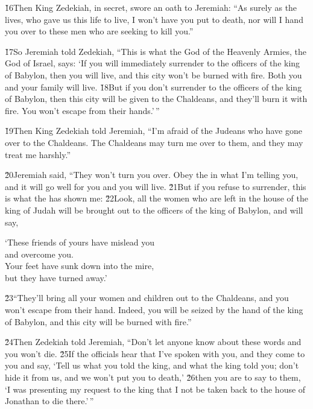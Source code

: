 \v{16}Then King Zedekiah, in secret, swore an oath to Jeremiah: ``As surely as the  lives, who gave us this life to live, I won't have you put to death, nor will I hand you over to these men who are seeking to kill you.''

\v{17}So Jeremiah told Zedekiah, ``This is what the  God of the Heavenly Armies, the God of Israel, says: `If you will immediately surrender to the officers of the king of Babylon, then you will live, and this city won't be burned with fire. Both you and your family will live. \v{18}But if you don't surrender to the officers of the king of Babylon, then this city will be given to the Chaldeans, and they'll burn it with fire. You won't escape from their hands.'\,''

\v{19}Then King Zedekiah told Jeremiah, ``I'm afraid of the Judeans who have gone over to the Chaldeans. The Chaldeans may turn me over to them, and they may treat me harshly.''

\v{20}Jeremiah said, ``They won't turn you over. Obey the  in what I'm telling you, and it will go well for you and you will live. \v{21}But if you refuse to surrender, this is what the  has shown me: \v{22}Look, all the women who are left in the house of the king of Judah will be brought out to the officers of the king of Babylon, and will say,

\begin{poetry}
\poeml `These friends of yours have mislead you \\
\poemll    and overcome you. \\
\poeml Your feet have sunk down into the mire, \\
\poemll    but they have turned away.'
\end{poetry}

\v{23}``They'll bring all your women and children out to the Chaldeans, and you won't escape from their hand. Indeed, you will be seized by the hand of the king of Babylon, and this city will be burned with fire.''

\v{24}Then Zedekiah told Jeremiah, ``Don't let anyone know about these words and you won't die. \v{25}If the officials hear that I've spoken with you, and they come to you and say, `Tell us what you told the king, and what the king told you; don't hide it from us, and we won't put you to death,' \v{26}then you are to say to them, `I was presenting my request to the king that I not be taken back to the house of Jonathan to die there.'\,''


